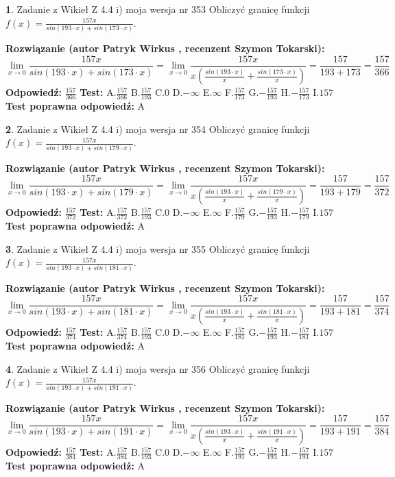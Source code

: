 \documentclass[12pt, a4paper]{article}
\theoremstyle{definition} %
\newtheorem{zad}{}
\newcommand{\zadStart}[1]{\begin{zad}#1\newline}
\newcommand{\zadStop}{\end{zad}}
\newcommand{\rozwStart}[2]{\noindent \textbf{Rozwiązanie (autor #1 , recenzent #2): }\newline}
\newcommand{\rozwStop}{\newline}
\newcommand{\odpStart}{\noindent \textbf{Odpowiedź:}\newline}
\newcommand{\odpStop}{\newline}
\newcommand{\testStart}{\noindent \textbf{Test:}\newline}
\newcommand{\testStop}{\newline}
\newcommand{\kluczStart}{\noindent \textbf{Test poprawna odpowiedź:}\newline}
\newcommand{\kluczStop}{\newline}
\begin{document}
\zadStart{Zadanie z Wikieł Z 4.4 i) moja wersja nr 353}
Obliczyć granicę funkcji $f(x)=\frac{157x}{sin(193\cdot x) +sin(173\cdot x)}$.
\zadStop
\rozwStart{Patryk Wirkus}{Szymon Tokarski}
$$\lim\limits_{x\to 0}\frac{157x}{sin(193\cdot x) +sin(173\cdot x)}=\lim\limits_{x\to 0}\frac{157x}{x(\frac{sin(193\cdot x)}{x}+\frac{sin(173\cdot x)}{x})}=\frac{157}{193+173} = \frac{157}{366}$$
\rozwStop
\odpStart
$\frac{157}{366}$
\odpStop
\testStart
A.$\frac{157}{366}$
B.$\frac{157}{193}$
C.$0$
D.$-\infty$
E.$\infty$
F.$\frac{157}{173}$
G.$-\frac{157}{193}$
H.$-\frac{157}{173}$
I.$157$
\testStop
\kluczStart
A
\kluczStop



\zadStart{Zadanie z Wikieł Z 4.4 i) moja wersja nr 354}
Obliczyć granicę funkcji $f(x)=\frac{157x}{sin(193\cdot x) +sin(179\cdot x)}$.
\zadStop
\rozwStart{Patryk Wirkus}{Szymon Tokarski}
$$\lim\limits_{x\to 0}\frac{157x}{sin(193\cdot x) +sin(179\cdot x)}=\lim\limits_{x\to 0}\frac{157x}{x(\frac{sin(193\cdot x)}{x}+\frac{sin(179\cdot x)}{x})}=\frac{157}{193+179} = \frac{157}{372}$$
\rozwStop
\odpStart
$\frac{157}{372}$
\odpStop
\testStart
A.$\frac{157}{372}$
B.$\frac{157}{193}$
C.$0$
D.$-\infty$
E.$\infty$
F.$\frac{157}{179}$
G.$-\frac{157}{193}$
H.$-\frac{157}{179}$
I.$157$
\testStop
\kluczStart
A
\kluczStop



\zadStart{Zadanie z Wikieł Z 4.4 i) moja wersja nr 355}
Obliczyć granicę funkcji $f(x)=\frac{157x}{sin(193\cdot x) +sin(181\cdot x)}$.
\zadStop
\rozwStart{Patryk Wirkus}{Szymon Tokarski}
$$\lim\limits_{x\to 0}\frac{157x}{sin(193\cdot x) +sin(181\cdot x)}=\lim\limits_{x\to 0}\frac{157x}{x(\frac{sin(193\cdot x)}{x}+\frac{sin(181\cdot x)}{x})}=\frac{157}{193+181} = \frac{157}{374}$$
\rozwStop
\odpStart
$\frac{157}{374}$
\odpStop
\testStart
A.$\frac{157}{374}$
B.$\frac{157}{193}$
C.$0$
D.$-\infty$
E.$\infty$
F.$\frac{157}{181}$
G.$-\frac{157}{193}$
H.$-\frac{157}{181}$
I.$157$
\testStop
\kluczStart
A
\kluczStop



\zadStart{Zadanie z Wikieł Z 4.4 i) moja wersja nr 356}
Obliczyć granicę funkcji $f(x)=\frac{157x}{sin(193\cdot x) +sin(191\cdot x)}$.
\zadStop
\rozwStart{Patryk Wirkus}{Szymon Tokarski}
$$\lim\limits_{x\to 0}\frac{157x}{sin(193\cdot x) +sin(191\cdot x)}=\lim\limits_{x\to 0}\frac{157x}{x(\frac{sin(193\cdot x)}{x}+\frac{sin(191\cdot x)}{x})}=\frac{157}{193+191} = \frac{157}{384}$$
\rozwStop
\odpStart
$\frac{157}{384}$
\odpStop
\testStart
A.$\frac{157}{384}$
B.$\frac{157}{193}$
C.$0$
D.$-\infty$
E.$\infty$
F.$\frac{157}{191}$
G.$-\frac{157}{193}$
H.$-\frac{157}{191}$
I.$157$
\testStop
\kluczStart
A
\kluczStop
\end{document}
